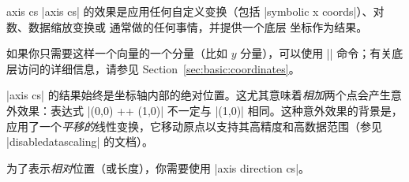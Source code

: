 \begin{coordinatesystem}{axis cs}
    |axis cs| 的效果是应用任何自定义变换（包括 |symbolic x coords|）、对数、数据缩放变换或 \PGFPlots{} 通常做的任何事情，并提供一个底层 \pgfname{} 坐标作为结果。

    如果你只需要这样一个向量的一个分量（比如 $y$ 分量），可以使用 |\pgfplotstransformcoordinatey| 命令；有关底层访问的详细信息，请参见 Section~\ref{sec:basic:coordinates}。

    |axis cs| 的结果始终是坐标轴内部的绝对位置。这尤其意味着\emph{相加}两个点会产生意外效果：表达式 |(0,0) ++ (1,0)| 不一定与 |(1,0)| 相同。这种意外效果的背景是，\PGFPlots{} 应用了一个\emph{平移的}线性变换，它移动原点以支持其高精度和高数据范围（参见 |disabledatascaling| 的文档）。

    为了表示\emph{相对}位置（或长度），你需要使用 |axis direction cs|。
\end{coordinatesystem}

